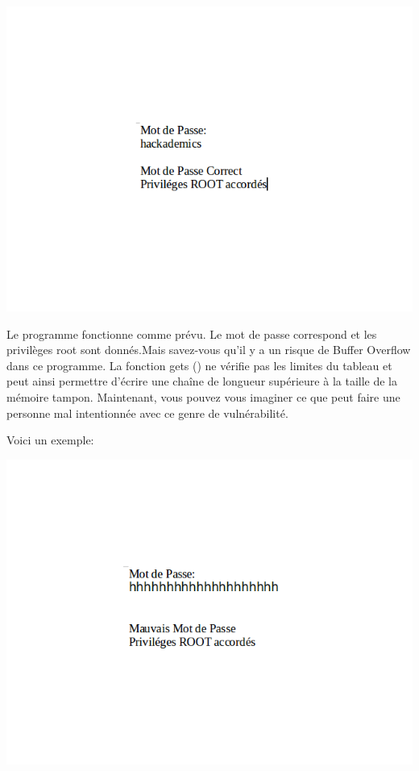 \begin{center}
\vspace{0.5cm}
\includegraphics[scale=0.3]{Application/assets/bmdp.png}
\vspace{0.5cm}
\end{center}

Le programme fonctionne comme prévu. Le mot de passe correspond et les privilèges root sont donnés.Mais savez-vous qu'il y a un risque de Buffer Overflow dans ce programme. La fonction gets () ne vérifie pas les limites du tableau et peut ainsi permettre d'écrire une chaîne de longueur supérieure à la taille de la mémoire tampon. Maintenant, vous pouvez vous imaginer ce que peut faire une personne mal intentionnée avec ce genre de vulnérabilité.

\vspace{0.5cm}

Voici un exemple:

\begin{center}
\vspace{0.5cm}
\includegraphics[scale=0.3]{Application/assets/mmdp.png}
\vspace{0.5cm}
\end{center}


